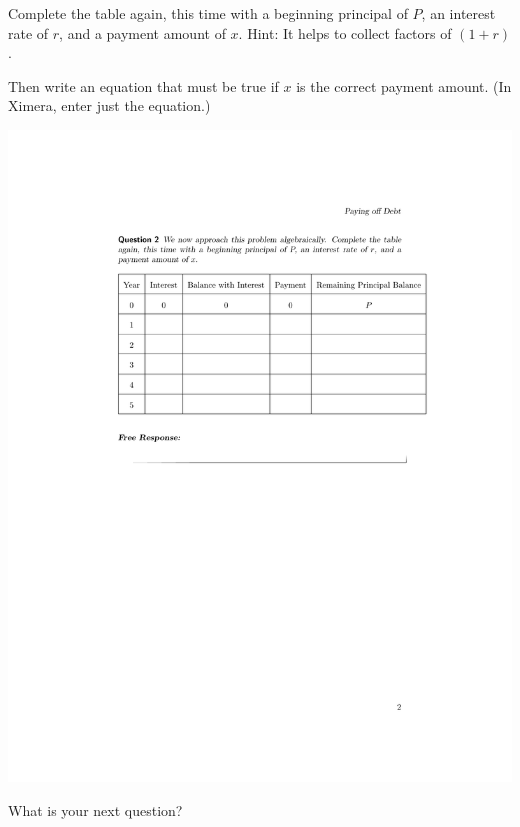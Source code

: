 \documentclass[handout,space,nooutcomes]{ximera}
\begin{document}
\begin{question}[.5in]
Complete the table again, this time with a beginning principal of $P$, an interest rate of $r$,
and a payment amount of $x$.  Hint: It helps to collect factors of $(1+r)$.

Then write an equation that must be true if $x$ is the correct
payment amount.   (In Ximera, enter just the equation.)

\includegraphics{payingOffDebtTableGraphic2.pdf}

\begin{freeResponse}
\end{freeResponse}
\end{question}

\begin{question}
What is your next question?   
\begin{freeResponse}
\end{freeResponse}
\end{question}
\end{document}
